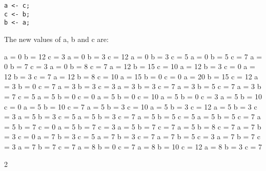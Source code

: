 \documentclass[10pt]{exam}
\begin{document}
\begin{questions}
\begin{minipage}[t][][t]{0.18\textwidth}
\begin{lstlisting}
a <- c;
c <- b;
b <- a;
  \end{lstlisting}
\end{minipage}
  \hfill
\begin{minipage}[t][][t]{0.75\textwidth}
  The new values of a, b and c are:
  \begin{multicols*}{3}
\begin{checkboxes}
    \choice a = 0 b = 12 c = 3
    \choice a = 0 b = 3 c = 12
    \choice a = 0 b = 3 c = 5
    \choice a = 0 b = 5 c = 7
    \choice a = 0 b = 7 c = 3
    \choice a = 0 b = 8 c = 7
    \choice a = 12 b = 15 c = 10
    \choice a = 12 b = 3 c = 0
    \choice a = 12 b = 3 c = 7
    \choice a = 12 b = 8 c = 10
    \choice a = 15 b = 0 c = 0
    \choice a = 20 b = 15 c = 12
    \choice a = 3 b = 0 c = 7
    \choice a = 3 b = 3 c = 3
    \choice a = 3 b = 3 c = 7
    \choice a = 3 b = 5 c = 7
    \choice a = 3 b = 7 c = 5
    \choice a = 5 b = 0 c = 0
    \choice a = 5 b = 0 c = 10
    \choice a = 5 b = 0 c = 3
    \choice a = 5 b = 10 c = 0
    \choice a = 5 b = 10 c = 7
    \choice a = 5 b = 3 c = 10
    \choice a = 5 b = 3 c = 12
    \choice a = 5 b = 3 c = 3
    \choice a = 5 b = 3 c = 5
    \choice a = 5 b = 3 c = 7
    \choice a = 5 b = 5 c = 5
    \choice a = 5 b = 5 c = 7
    \choice a = 5 b = 7 c = 0
    \choice a = 5 b = 7 c = 3
    \choice a = 5 b = 7 c = 7
    \choice a = 5 b = 8 c = 7
    \choice a = 7 b = 3 c = 0
    \choice a = 7 b = 3 c = 5
    \choice a = 7 b = 3 c = 7
    \choice a = 7 b = 5 c = 3
    \choice a = 7 b = 7 c = 3
    \choice a = 7 b = 7 c = 7
    \choice a = 8 b = 0 c = 7
    \choice a = 8 b = 10 c = 12
    \choice a = 8 b = 3 c = 7
  \end{checkboxes}
\end{multicols*}
\end{minipage}2
\end{questions}
\end{document}
